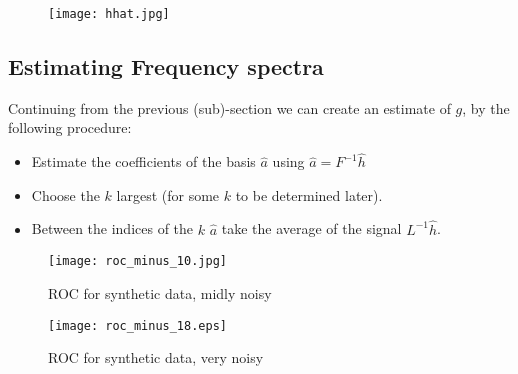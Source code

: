 \begin{figure}[h]
\centering
\texttt{[image: hhat.jpg]}
\caption{}
\label{fig:hhat}
\end{figure}

\subsection{Estimating Frequency spectra}

Continuing from the previous (sub)-section we can create an estimate of \(g\), by the following procedure:

\begin{itemize}
\item Estimate the coefficients of the basis \(\hat{a}\) using \(\hat{a} = F^{-1} \hat{h}\)
\item Choose the \(k\) largest (for some \(k\) to be determined later).
\item Between the indices of the \(k\) \(\hat{a}\) take the average of the signal \(L^{-1}\hat{h}\).
\end{itemize}


\begin{figure}[h]
\centering
\texttt{[image: roc\_minus\_10.jpg]}
\caption{ROC for synthetic data, midly noisy}
\label{fig:hvb}
\end{figure}

\begin{figure}[h]
\centering
\texttt{[image: roc\_minus\_18.eps]}
\caption{ROC for synthetic data, very noisy}
\label{fig:hvb}
\end{figure}
